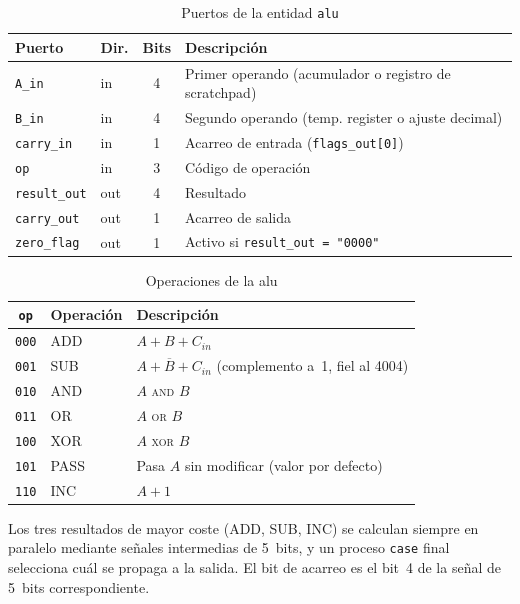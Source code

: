 \documentclass[%
    school=etsisi,%
    type=pfg,%
    degree=61CI,%
]{upm-report}
\begin{document}
\begin{table}[H]
\centering
\caption{Puertos de la entidad \texttt{alu}}
\label{tab:alu}
\begin{tabularx}{\textwidth}{@{}llcX@{}}
\toprule
\textbf{Puerto}     & \textbf{Dir.} & \textbf{Bits} & \textbf{Descripción} \\
\midrule
\texttt{A\_in}        & in  & 4 & Primer operando (acumulador o registro de scratchpad) \\
\texttt{B\_in}        & in  & 4 & Segundo operando (temp. register o ajuste decimal) \\
\texttt{carry\_in}    & in  & 1 & Acarreo de entrada (\texttt{flags\_out[0]}) \\
\texttt{op}           & in  & 3 & Código de operación \\
\texttt{result\_out}  & out & 4 & Resultado \\
\texttt{carry\_out}   & out & 1 & Acarreo de salida \\
\texttt{zero\_flag}   & out & 1 & Activo si \texttt{result\_out = "0000"} \\
\bottomrule
\end{tabularx}
\end{table}

\begin{table}[H]
\centering
\caption{Operaciones de la \acrshort{alu}}
\label{tab:alu-ops}
\begin{tabularx}{\textwidth}{@{}clX@{}}
\toprule
\textbf{\texttt{op}} & \textbf{Operación} & \textbf{Descripción} \\
\midrule
\texttt{000} & ADD  & $A + B + C_{in}$ \\
\texttt{001} & SUB  & $A + \overline{B} + C_{in}$ (complemento a~1, fiel al 4004) \\
\texttt{010} & AND  & $A$ \textsc{and} $B$ \\
\texttt{011} & OR   & $A$ \textsc{or} $B$ \\
\texttt{100} & XOR  & $A$ \textsc{xor} $B$ \\
\texttt{101} & PASS & Pasa $A$ sin modificar (valor por defecto) \\
\texttt{110} & INC  & $A + 1$ \\
\bottomrule
\end{tabularx}
\end{table}

Los tres resultados de mayor coste (ADD, SUB, INC) se calculan siempre en
paralelo mediante señales intermedias de 5~bits, y un proceso \texttt{case}
final selecciona cuál se propaga a la salida.  El bit de acarreo es el
bit~4 de la señal de 5~bits correspondiente.
\end{document}
